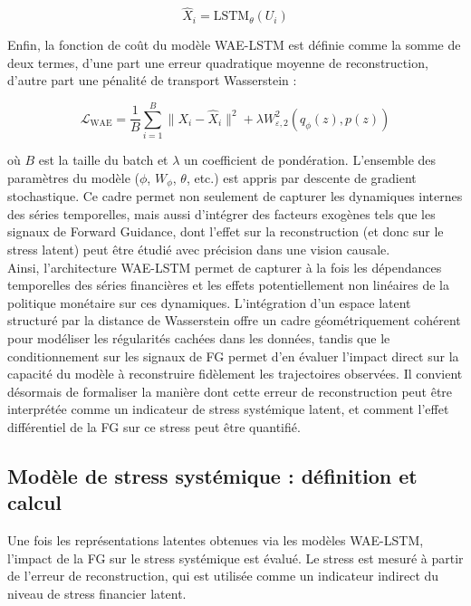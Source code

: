 \begin{equation}
\widehat{X}_i = \mathrm{LSTM}_\theta(U_i)
\end{equation}

Enfin, la fonction de coût du modèle WAE-LSTM est définie comme la somme de deux termes, d'une part une erreur quadratique moyenne de reconstruction, d'autre part une pénalité de transport Wasserstein :

\begin{equation}
\mathcal{L}_{\mathrm{WAE}} = \frac{1}{B} \sum_{i=1}^B \|X_i - \widehat{X}_i\|^2 + \lambda W_{\varepsilon,2}^2(q_\phi(z), p(z))
\end{equation}

où $B$ est la taille du batch et $\lambda$ un coefficient de pondération. L’ensemble des paramètres du modèle ($\phi$, $W_\phi$, $\theta$, etc.) est appris par descente de gradient stochastique. Ce cadre permet non seulement de capturer les dynamiques internes des séries temporelles, mais aussi d’intégrer des facteurs exogènes tels que les signaux de Forward Guidance, dont l’effet sur la reconstruction (et donc sur le stress latent) peut être étudié avec précision dans une vision causale.\\

Ainsi, l’architecture WAE-LSTM permet de capturer à la fois les dépendances temporelles des séries financières et les effets potentiellement non linéaires de la politique monétaire sur ces dynamiques. L’intégration d’un espace latent structuré par la distance de Wasserstein offre un cadre géométriquement cohérent pour modéliser les régularités cachées dans les données, tandis que le conditionnement sur les signaux de FG permet d’en évaluer l’impact direct sur la capacité du modèle à reconstruire fidèlement les trajectoires observées. Il convient désormais de formaliser la manière dont cette erreur de reconstruction peut être interprétée comme un indicateur de stress systémique latent, et comment l’effet différentiel de la FG sur ce stress peut être quantifié.

\subsection{Modèle de stress systémique : définition et calcul}

Une fois les représentations latentes obtenues via les modèles WAE-LSTM, l’impact de la FG sur le stress systémique est évalué. Le stress est mesuré à partir de l’erreur de reconstruction, qui est utilisée comme un indicateur indirect du niveau de stress financier latent.\\

